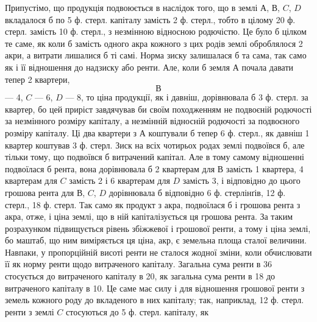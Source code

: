 Припустімо, що продукція подвоюється в наслідок того, що в землі $А$,
$В$, $C$, $D$ вкладалося б по 5 ф. стерл. капіталу замість 2 ф. стерл., тобто
в цілому 20 ф. стерл. замість 10 ф. стерл., з незмінною відносною родючістю.
Це було б цілком те саме, як коли б замість одного акра кожного з цих
родів землі оброблялося 2 акри, а витрати лишалися б ті самі. Норма зиску
залишалася б та сама, так само як і її відношення до надзиску або ренти. Але,
коли б земля $А$ почала давати тепер 2 квартери, $$В$$ — 4, $C$ — 6, $D$ — 8, то ціна
продукції, як і давніш, дорівнювала б 3 ф. стерл. за квартер, бо цей приріст
завдячував би своїм походженням не подвоєній родючості за незмінного розміру
капіталу, а незмінній відносній родючості за подвоєного розміру капіталу. Ці
два квартери з $А$ коштували б тепер 6 ф. стерл., як давніш 1 квартер коштував
3 ф. стерл. Зиск на всіх чотирьох родах землі подвоївся б, але тільки
тому, що подвоївся б витрачений капітал. Але в тому самому відношенні подвоїлася
б рента, вона дорівнювала б 2 квартерам для $В$ замість 1 квартера, 4 квартерам
для $C$ замість 2 і 6 квартерам для $D$ замість 3, і відповідно до цього
грошова рента для $В$, $C$, $D$ дорівнювала б відповідно 6 ф. стерлінґів, 12 ф.
стерл., 18 ф. стерл. Так само як продукт з акра, подвоїлася б і грошова
рента з акра, отже, і ціна землі, що в ній капіталізується ця грошова рента. За
таким розрахунком підвищується рівень збіжжевої і грошової ренти, а тому і
ціна землі, бо маштаб, що ним виміряється ця ціна, акр, є земельна площа
сталої величини. Навпаки, у пропорційній висоті ренти не сталося жодної зміни,
коли обчислювати її як норму ренти щодо витраченого капіталу. Загальна сума
ренти в 36 стосується до витраченого капіталу в 20, як загальна сума ренти
в 18 до витраченого капіталу в 10. Це саме має силу і для відношення грошової
ренти з земель кожного роду до вкладеного в них капіталу; так, наприклад,
12 ф. стерл. ренти з землі $C$ стосуються до 5 ф. стерл. капіталу, як
\parbreak{}  %
